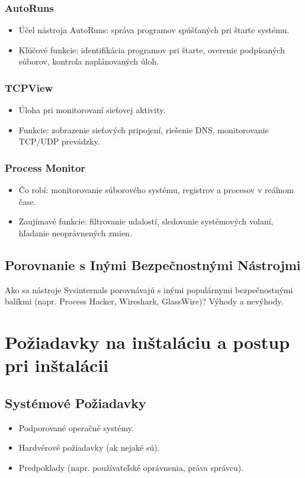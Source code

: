 \documentclass[conference]{IEEEtran}
\begin{document}

\subsubsection{AutoRuns}
\begin{itemize}
    \item Účel nástroja AutoRuns: správa programov spúšťaných pri štarte systému.
    \item Kľúčové funkcie: identifikácia programov pri štarte, overenie podpísaných súborov, kontrola naplánovaných úloh.
\end{itemize}

\subsubsection{TCPView}
\begin{itemize}
    \item Úloha pri monitorovaní sieťovej aktivity.
    \item Funkcie: zobrazenie sieťových pripojení, riešenie DNS, monitorovanie TCP/UDP prevádzky.
\end{itemize}

\subsubsection{Process Monitor}
\begin{itemize}
    \item Čo robí: monitorovanie súborového systému, registrov a procesov v reálnom čase.
    \item Zaujímavé funkcie: filtrovanie udalostí, sledovanie systémových volaní, hľadanie neoprávnených zmien.
\end{itemize}

\subsection{Porovnanie s Inými Bezpečnostnými Nástrojmi}
Ako sa nástroje Sysinternals porovnávajú s inými populárnymi bezpečnostnými balíkmi (napr. Process Hacker, Wireshark, GlassWire)? Výhody a nevýhody.

\section{Požiadavky na inštaláciu a postup pri inštalácii}
\subsection{Systémové Požiadavky}
\begin{itemize}
    \item Podporované operačné systémy.
    \item Hardvérové požiadavky (ak nejaké sú).
    \item Predpoklady (napr. používateľské oprávnenia, práva správcu).
\end{itemize}
\end{document}
